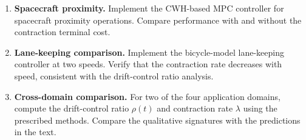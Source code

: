 \begin{enumerate}
\item \textbf{Spacecraft proximity.}
      Implement the CWH-based MPC controller for spacecraft proximity operations.
      Compare performance with and without the contraction terminal cost.

\item \textbf{Lane-keeping comparison.}
      Implement the bicycle-model lane-keeping controller at two speeds. Verify that
      the contraction rate decreases with speed, consistent with the drift-control
      ratio analysis.

\item \textbf{Cross-domain comparison.}
      For two of the four application domains, compute the drift-control ratio $\rho(t)$
      and contraction rate $\lambda$ using the prescribed methods. Compare the
      qualitative signatures with the predictions in the text.
\end{enumerate}
